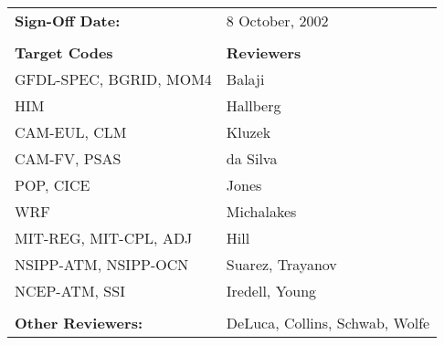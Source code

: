 
\begin{tabular}{l l}

{\bf Sign-Off Date:}          & 8 October, 2002 \\ \\

{\bf Target Codes}            & {\bf Reviewers} \\
GFDL-SPEC, BGRID, MOM4        & Balaji \\ 
HIM                           & Hallberg \\
CAM-EUL, CLM                  & Kluzek \\
CAM-FV, PSAS                  & da Silva\\
POP, CICE                     & Jones \\
WRF                           & Michalakes \\
MIT-REG, MIT-CPL, ADJ         & Hill \\
NSIPP-ATM, NSIPP-OCN          & Suarez, Trayanov \\
NCEP-ATM, SSI                 & Iredell, Young \\ \\

{\bf Other Reviewers:}        & DeLuca, Collins, Schwab, Wolfe

\end{tabular}


